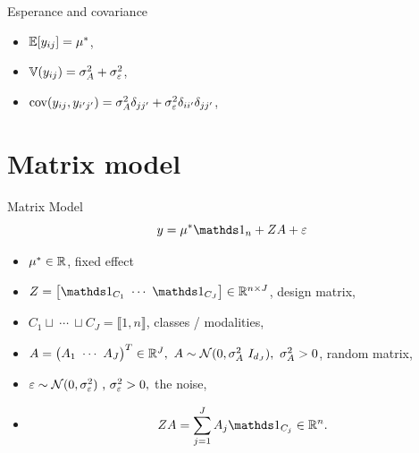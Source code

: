 \documentclass[unknownkeysallowed]{beamer}
\begin{document}
\begin{frame}{Esperance and covariance}
\begin{itemize}
    \item $\mathbb{E}[y_{ij}]=\mu^* $, 
    \item $\mathbb{V}(y_{ij})=\sigma_A^2 + \sigma_{\varepsilon}^2$,
    \item $\operatorname{cov}(y_{ij},y_{i'j'})=\sigma_A^2\delta_{jj'} + \sigma_{\varepsilon}^2\delta_{ii'}\delta_{jj'}$,
\end{itemize}


\end{frame}
\section{Matrix model}
\label{sub:matrix}
\begin{frame}{Matrix Model}
{\[y=\mu^* \bbI_n+ ZA+\varepsilon\]}
\medskip

 \begin{itemize} 
        \item $\mu^* \in \mathbb{R}$, fixed effect
        \item $Z = \begin{bmatrix} \bbI_{C_1} \  \cdots \  \bbI_{C_J} \end{bmatrix} \in \bbR^{n \times J}$, design matrix, 
        \item $C_1\sqcup \ \cdots \ \sqcup C_J = \llbracket 1,n \rrbracket$, classes / modalities,
        \item $A = \begin{pmatrix}
                    A_1 \ \cdots \ A_J
                    \end{pmatrix}^T \in \bbR^J, \ 
        A \sim \cN(0, \sigma_A^2 \ I_{d_J}), \text{ } \sigma_A^2>0$, random matrix,
        \item $\varepsilon \sim \mathcal{N}(0,\sigma_{\varepsilon}^2) \text{ , } \sigma_{\varepsilon}^2>0,$ the noise,
        \item \[ ZA = \sum_{j=1}^J A_j \bbI_{C_j} \in \bbR^n. \]
    \end{itemize}

\end{frame}
\end{document}
